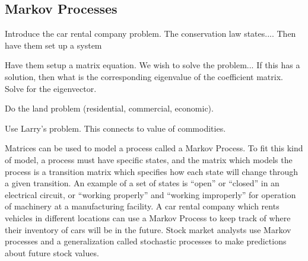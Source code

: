 \subsection{Markov Processes}
Introduce the car rental company problem.  The conservation law states....  Then have them set up a system
\begin{problem}
 Have them setup a matrix equation. We wish to solve the problem...  If this has a solution, then what is the corresponding eigenvalue of the coefficient matrix.  Solve for the eigenvector.
\end{problem}

\begin{problem}
Do the land problem (residential, commercial, economic). 
\end{problem}


\begin{problem}
 Use Larry's problem.  This connects to value of commodities.
\end{problem}


Matrices can be used to model a process called a Markov Process. To fit this kind of model, a process must have specific states, and the matrix which models the process is a transition matrix which specifies how each state will change through a given transition. An example of a set of states is ``open'' or ``closed'' in an electrical circuit, or ``working properly'' and ``working improperly'' for operation of machinery at a manufacturing facility. A car rental company which rents vehicles in different locations can use a Markov Process to keep track of where their inventory of cars will be in the future. Stock market analysts use Markov processes and a generalization called stochastic processes to make predictions about future stock values.

